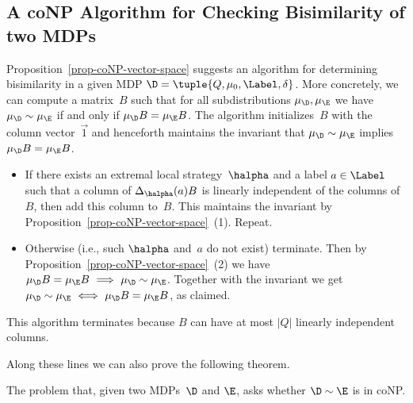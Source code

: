 \subsection{A coNP Algorithm for Checking Bisimilarity of two MDPs}\label{subsec:algo_conp_bisimilarity}

Proposition~\ref{prop-coNP-vector-space}
suggests an algorithm for determining bisimilarity in a given MDP $\D = \tuple{Q,\mu_{0},\Label,\delta}$.
More concretely, we can compute a matrix~$B$ such that for all subdistributions $\mu_\D, \mu_\E$ we have $\mu_\D \sim \mu_\E$ if and only if $\mu_\D B = \mu_\E B$.
The algorithm initializes~$B$ with the column vector~$\vec{1}$ and henceforth maintains the invariant that $\mu_\D \sim \mu_\E$ implies $\mu_\D B = \mu_\E B$.
\begin{itemize}
\item
If there exists an extremal local strategy~$\halpha$ and a label $a \in \Label$ such that a column of $\Delta_{\halpha}(a) B$ is linearly independent of the columns of~$B$, then add this column to~$B$.
This maintains the invariant by Proposition~\ref{prop-coNP-vector-space}~(1).
Repeat.
\item
Otherwise (i.e., such $\halpha$ and~$a$ do not exist) terminate.
Then by Proposition~\ref{prop-coNP-vector-space}~(2) we have $\mu_\D B = \mu_\E B \ \Longrightarrow \ \mu_\D \sim \mu_\E$.
Together with the invariant we get $\mu_\D \sim \mu_\E \ \Longleftrightarrow \ \mu_\D B = \mu_\E B$, as claimed.
\end{itemize}
This algorithm terminates because $B$ can have at most $|Q|$ linearly independent columns.

Along these lines we can also prove the following theorem.

\begin{thm}\label{thm-coNP-result}
The problem that, given two MDPs~$\D$ and $\E$, asks whether $\D \sim \E$ is in {\sf coNP}.
\end{thm}

